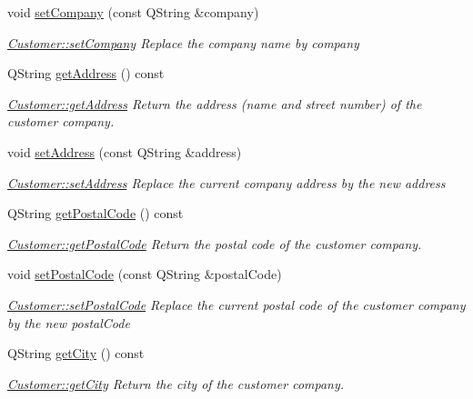 \begin{DoxyCompactItemize}
void \hyperlink{classCustomer_a9d13cc3ad8464df4211da10213821fcc}{set\-Company} (const Q\-String \&company)
\begin{DoxyCompactList}\small\item\em \hyperlink{classCustomer_a9d13cc3ad8464df4211da10213821fcc}{Customer\-::set\-Company} Replace the company name by {\itshape company} \end{DoxyCompactList}\item 
Q\-String \hyperlink{classCustomer_af3e348865143342ad9c67981eb61e0c8}{get\-Address} () const 
\begin{DoxyCompactList}\small\item\em \hyperlink{classCustomer_af3e348865143342ad9c67981eb61e0c8}{Customer\-::get\-Address} Return the address (name and street number) of the customer company. \end{DoxyCompactList}\item 
void \hyperlink{classCustomer_addd0675e408a13f6ab95ec5bd5a3a13b}{set\-Address} (const Q\-String \&address)
\begin{DoxyCompactList}\small\item\em \hyperlink{classCustomer_addd0675e408a13f6ab95ec5bd5a3a13b}{Customer\-::set\-Address} Replace the current company address by the new {\itshape address} \end{DoxyCompactList}\item 
Q\-String \hyperlink{classCustomer_a39073588f2d7669b12a8ecc33b3c4224}{get\-Postal\-Code} () const 
\begin{DoxyCompactList}\small\item\em \hyperlink{classCustomer_a39073588f2d7669b12a8ecc33b3c4224}{Customer\-::get\-Postal\-Code} Return the postal code of the customer company. \end{DoxyCompactList}\item 
void \hyperlink{classCustomer_a3973123c0e94d876124cfdd0444acfd1}{set\-Postal\-Code} (const Q\-String \&postal\-Code)
\begin{DoxyCompactList}\small\item\em \hyperlink{classCustomer_a3973123c0e94d876124cfdd0444acfd1}{Customer\-::set\-Postal\-Code} Replace the current postal code of the customer company by the new {\itshape postal\-Code} \end{DoxyCompactList}\item 
Q\-String \hyperlink{classCustomer_a1eaf38d67a4ac9c8fcc675ff81f724ba}{get\-City} () const 
\begin{DoxyCompactList}\small\item\em \hyperlink{classCustomer_a1eaf38d67a4ac9c8fcc675ff81f724ba}{Customer\-::get\-City} Return the city of the customer company. \end{DoxyCompactList}\item 

\end{DoxyCompactItemize}
